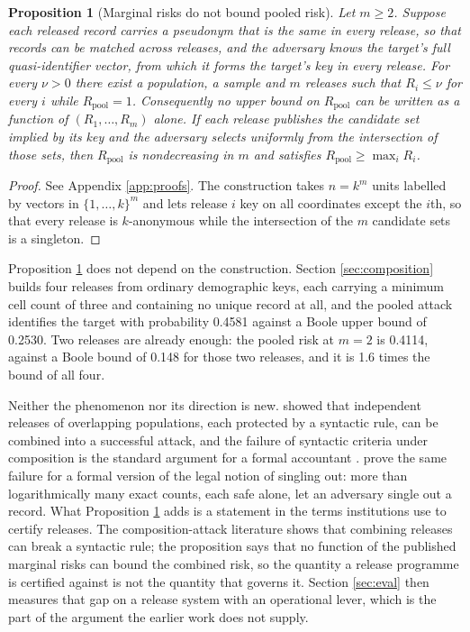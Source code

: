 \documentclass[11pt,a4paper]{article}
\theoremstyle{plain}
\newtheorem{proposition}{Proposition}
\theoremstyle{definition}
\begin{document}
\begin{proposition}[Marginal risks do not bound pooled risk]\label{prop:nopool}
Let $m \geq 2$. Suppose each released record carries a pseudonym that is the same
in every release, so that records can be matched across releases, and the adversary
knows the target's full quasi-identifier vector, from which it forms the target's key
in every release. For every $\nu > 0$ there exist a population, a sample and $m$
releases such that $R_i \leq \nu$ for every $i$ while
$R_{\mathrm{pool}} = 1$. Consequently no upper bound on $R_{\mathrm{pool}}$ can
be written as a function of $(R_1, \dots, R_m)$ alone. If each release
publishes the candidate set implied by its key and the adversary selects
uniformly from the intersection of those sets, then $R_{\mathrm{pool}}$ is
nondecreasing in $m$ and satisfies $R_{\mathrm{pool}} \geq \max_i R_i$.
\end{proposition}

\begin{proof}
See Appendix \ref{app:proofs}. The construction takes $n = k^m$ units labelled
by vectors in $\{1, \dots, k\}^m$ and lets release $i$ key on all coordinates
except the $i$th, so that every release is $k$-anonymous while the intersection
of the $m$ candidate sets is a singleton.
\end{proof}

Proposition \ref{prop:nopool} does not depend on the construction. Section
\ref{sec:composition} builds four releases from ordinary demographic keys, each
carrying a minimum cell count of three and containing no unique record at all,
and the pooled attack identifies the target with probability 0.4581 against a
Boole upper bound of 0.2530. Two releases are already enough: the pooled risk at
$m = 2$ is 0.4114, against a Boole bound of 0.148 for those two releases, and it is 1.6 times the bound of all four.

Neither the phenomenon nor its direction is new. \citet{ganta2008} showed that
independent releases of overlapping populations, each protected by a syntactic
rule, can be combined into a successful attack, and the failure of syntactic
criteria under composition is the standard argument for a formal accountant
\citep{dwork2006a,dwork2014}. \citet{cohen2020} prove the same failure for a
formal version of the legal notion of singling out: more than logarithmically
many exact counts, each safe alone, let an adversary single out a record. What Proposition \ref{prop:nopool} adds is a
statement in the terms institutions use to certify releases. The
composition-attack literature shows that combining releases can break a syntactic rule;
the proposition says that no function of the published marginal risks can bound
the combined risk, so the quantity a release programme is certified against is
not the quantity that governs it. Section \ref{sec:eval} then measures that gap on
a release system with an operational lever, which is the part of the argument the
earlier work does not supply.
\end{document}
